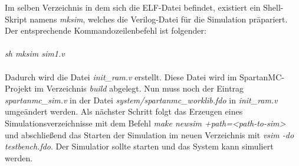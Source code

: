 Im selben Verzeichnis in dem sich die ELF-Datei befindet, existiert ein Shell-Skript namens \textit{mksim}, welches die Verilog-Datei für die Simulation präpariert. Der entsprechende Kommandozeilenbefehl ist folgender:\\\\
\indent \textit{sh mksim sim1.v}\\\\
Dadurch wird die Datei \textit{init\_ram.v} erstellt. Diese Datei wird im SpartanMC-Projekt im Verzeichnis \textit{build} abgelegt. Nun muss noch der Eintrag \textit{spartanmc\_sim.v} in der Datei \textit{system/spartanmc\_worklib.fdo} in \textit{init\_ram.v} umgeändert werden. Als nächster Schritt folgt das Erzeugen eines Simulationsverzeichnisse mit dem Befehl \textit{make newsim +path=<path-to-sim>} und abschließend das Starten der Simulation im neuen Verzeichnis mit \textit{vsim -do testbench.fdo}. Der Simulatior sollte starten und das System kann simuliert werden. 